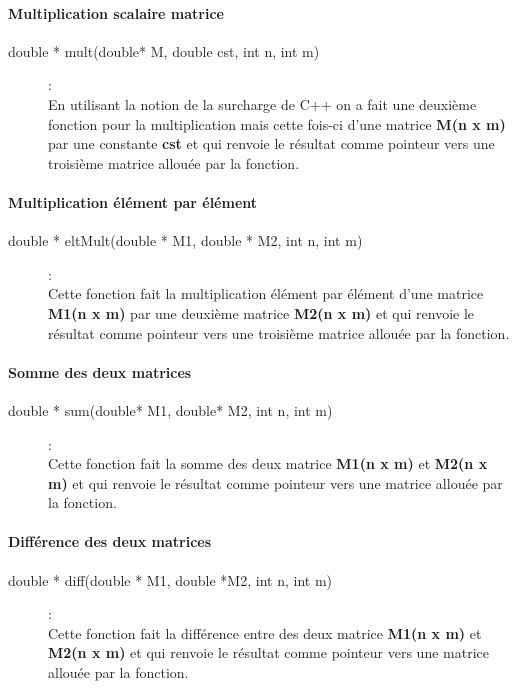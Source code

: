 \paragraph{Multiplication scalaire matrice}
\begin{description}
\item[{double * mult(double* M, double cst, int n, int m)}] : \\ En utilisant la notion de la surcharge de C++ on a fait une deuxième fonction pour la multiplication mais cette fois-ci d'une matrice \textbf{M(n x m)} par une constante \textbf{cst} et qui renvoie le résultat comme pointeur vers une troisième matrice allouée par la fonction.
\end{description}

\paragraph{Multiplication élément par élément}
\begin{description}
\item[{double * eltMult(double * M1, double * M2, int n, int m)}] :\\ Cette fonction fait la multiplication élément par élément d'une matrice \textbf{M1(n x m)} par une deuxième matrice \textbf{M2(n x m)} et qui renvoie le résultat comme pointeur vers une troisième matrice allouée par la fonction.
\end{description}

\paragraph{Somme des deux matrices}
\begin{description}
\item[{double * sum(double* M1, double* M2, int n, int m)}] :\\ Cette fonction fait la somme des deux matrice \textbf{M1(n x m)} et \textbf{M2(n x m)} et qui renvoie le résultat comme pointeur vers une matrice allouée par la fonction.
\end{description}

\paragraph{Différence des deux matrices}
\begin{description}
\item[{double * diff(double * M1, double *M2, int n, int m)}] :\\ Cette fonction fait la différence entre des deux matrice \textbf{M1(n x m)} et \textbf{M2(n x m)} et qui renvoie le résultat comme pointeur vers une matrice allouée par la fonction.
\end{description}

